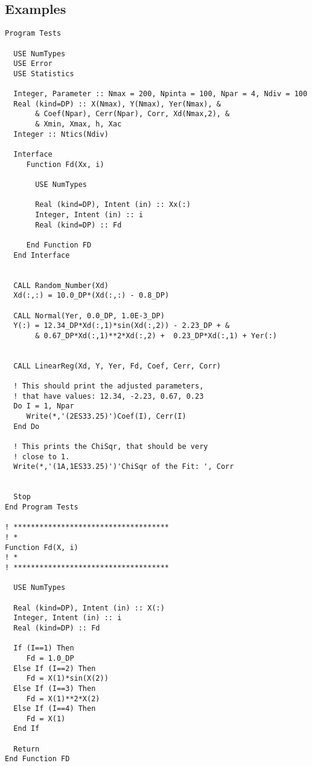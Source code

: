 \subsection{Examples}

\begin{lstlisting}[emph=LinearReg,
                   emphstyle=\color{blue},
                   frame=trBL,
                   caption=Doing linear regressions.,
                   label=linearreg]
Program Tests

  USE NumTypes
  USE Error
  USE Statistics

  Integer, Parameter :: Nmax = 200, Npinta = 100, Npar = 4, Ndiv = 100
  Real (kind=DP) :: X(Nmax), Y(Nmax), Yer(Nmax), &
       & Coef(Npar), Cerr(Npar), Corr, Xd(Nmax,2), &
       & Xmin, Xmax, h, Xac
  Integer :: Ntics(Ndiv)

  Interface
     Function Fd(Xx, i)
       
       USE NumTypes
       
       Real (kind=DP), Intent (in) :: Xx(:)
       Integer, Intent (in) :: i
       Real (kind=DP) :: Fd
       
     End Function FD
  End Interface


  CALL Random_Number(Xd)
  Xd(:,:) = 10.0_DP*(Xd(:,:) - 0.8_DP)

  CALL Normal(Yer, 0.0_DP, 1.0E-3_DP)
  Y(:) = 12.34_DP*Xd(:,1)*sin(Xd(:,2)) - 2.23_DP + &
       & 0.67_DP*Xd(:,1)**2*Xd(:,2) +  0.23_DP*Xd(:,1) + Yer(:) 


  CALL LinearReg(Xd, Y, Yer, Fd, Coef, Cerr, Corr)
  
  ! This should print the adjusted parameters, 
  ! that have values: 12.34, -2.23, 0.67, 0.23
  Do I = 1, Npar
     Write(*,'(2ES33.25)')Coef(I), Cerr(I)
  End Do

  ! This prints the ChiSqr, that should be very 
  ! close to 1.
  Write(*,'(1A,1ES33.25)')'ChiSqr of the Fit: ', Corr


  Stop
End Program Tests

! ************************************
! *
Function Fd(X, i)
! *
! ************************************

  USE NumTypes

  Real (kind=DP), Intent (in) :: X(:)
  Integer, Intent (in) :: i
  Real (kind=DP) :: Fd

  If (I==1) Then
     Fd = 1.0_DP
  Else If (I==2) Then
     Fd = X(1)*sin(X(2))
  Else If (I==3) Then
     Fd = X(1)**2*X(2)
  Else If (I==4) Then
     Fd = X(1)
  End If

  Return
End Function FD
\end{lstlisting}


